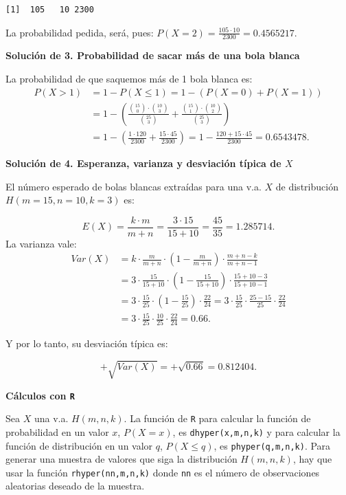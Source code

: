 \documentclass[
  letterpaper,
  DIV=11,
  numbers=noendperiod]{scrreprt}
\begin{document}
\begin{verbatim}
[1]  105   10 2300
\end{verbatim}

La probabilidad pedida, será, pues:
\(P(X=2)=\frac{105\cdot10 }{2300}=0.4565217.\)

\textbf{Solución de 3. Probabilidad de sacar más de una bola blanca}

La probabilidad de que saquemos más de 1 bola blanca es: \[
\begin{array}{rl}
P(X> 1)&= 1-P(X\leq 1)=1-(P(X=0)+P(X=1))\\
&=
1-\left(\frac{\binom{15}{0}\cdot \binom{10}{3}}{\binom{25}{3}}+
\frac{\binom{15}{1}\cdot \binom{10}{2}}{\binom{25}{3}}\right)\\
&=
1-\left(
\frac{1\cdot120 }{2300}+\frac{15\cdot45 }{2300}
\right)=1-\frac{120+15\cdot 45}{2300}=0.6543478.
\end{array}
\]

\textbf{Solución de 4. Esperanza, varianza y desviación típica de \(X\)}

El número esperado de bolas blancas extraídas para una v.a. \(X\) de
distribución \(H(m=15,n=10,k=3)\) es:

\[E(X)=\frac{k\cdot m}{m+n}=\frac{3\cdot 15}{15+10}=\frac{45}{35}=1.285714.\]
La varianza vale: \[
\begin{array}{rl}
Var(X)&=k\cdot\frac{m}{m+n}\cdot\left(1-\frac{m}{m+n}\right) \cdot\frac{m+n-k}{m+n-1}\\
&=3\cdot\frac{15}{15+10}\cdot\left(1-\frac{15}{15+10}\right) \cdot\frac{15+10-3}{15+10-1}\\
&=
3\cdot\frac{15}{25}\cdot\left(1-\frac{15}{25}\right) \cdot\frac{22}{24}= 
3\cdot\frac{15}{25}\cdot\frac{25-15}{25} \cdot\frac{22}{24}\\
&=
3\cdot\frac{15}{25}\cdot\frac{10}{25}\cdot\frac{22}{24}=0.66.
\end{array}
\]

Y por lo tanto, su desviación típica es:

\[
+\sqrt{Var(X)}=+\sqrt{0.66}=0.812404.
\]

\textbf{Cálculos con \texttt{R}}

Sea \(X\) una v.a. \(H(m,n,k)\). La función de \texttt{R} para calcular
la función de probabilidad en un valor \(x\), \(P(X=x)\), es
\texttt{dhyper(x,m,n,k)} y para calcular la función de distribución en
un valor \(q\), \(P(X\leq q)\), es \texttt{phyper(q,m,n,k)}. Para
generar una muestra de valores que siga la distribución \(H(m,n,k)\),
hay que usar la función \texttt{rhyper(nn,m,n,k)} donde \texttt{nn} es
el número de observaciones aleatorias deseado de la muestra.
\end{document}
